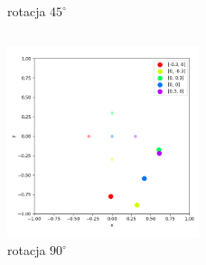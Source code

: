 \begin{frame}{}
\begin{columns}
\begin{column}{0.5\textwidth}
\begin{figure}
                \caption{rotacja $45^{\circ}$}
            \end{figure}
        \end{column}
    \end{columns}
\end{frame}

\begin{frame}
    \begin{figure}
        \centering
        \includegraphics[width=0.5\textwidth]{../pics/mult_lat_2d_angle/positions_90_mean.png}
        \caption{rotacja $90^{\circ}$}
    \end{figure}
\end{frame}